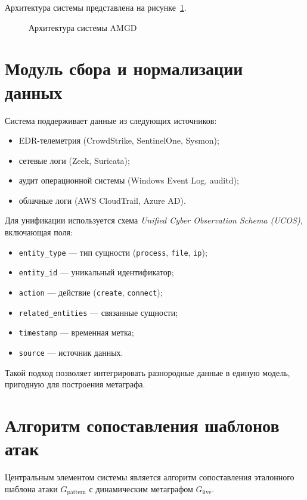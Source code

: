 Архитектура системы представлена на рисунке~\ref{fig:amgd_arch}.

\begin{figure}[ht]
    \centering
        
    \caption{Архитектура системы AMGD}
    \label{fig:amgd_arch}
\end{figure}

\section{Модуль сбора и нормализации данных}\label{sec:ch3/sect2}

Система поддерживает данные из следующих источников:

\noindent
\begin{itemize}
    \item EDR-телеметрия (CrowdStrike, SentinelOne, Sysmon);
    \item сетевые логи (Zeek, Suricata);
    \item аудит операционной системы (Windows Event Log, auditd);
    \item облачные логи (AWS CloudTrail, Azure AD).
\end{itemize}

Для унификации используется схема \textit{Unified Cyber Observation Schema (UCOS)}, включающая поля:

\noindent
\begin{itemize}
    \item \texttt{entity\_type} — тип сущности (\texttt{process}, \texttt{file}, \texttt{ip});
    \item \texttt{entity\_id} — уникальный идентификатор;
    \item \texttt{action} — действие (\texttt{create}, \texttt{connect});
    \item \texttt{related\_entities} — связанные сущности;
    \item \texttt{timestamp} — временная метка;
    \item \texttt{source} — источник данных.
\end{itemize}
Такой подход позволяет интегрировать разнородные данные в единую модель, пригодную для построения метаграфа.

\section{Алгоритм сопоставления шаблонов атак}\label{sec:ch3/sect3}

Центральным элементом системы является алгоритм сопоставления эталонного шаблона атаки $G_{\text{pattern}}$ с динамическим метаграфом $G_{\text{live}}$.

